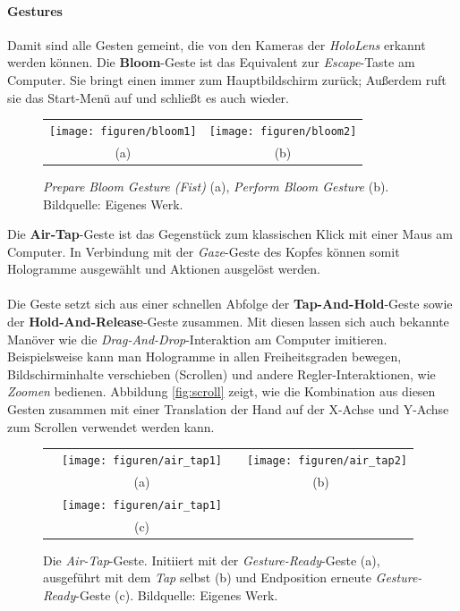 \paragraph*{Gestures} Damit sind alle Gesten gemeint, die von den Kameras der \textit{HoloLens} erkannt werden können.
Die \textbf{Bloom}-Geste ist das Equivalent zur \textit{Escape}-Taste am Computer. Sie bringt einen immer zum Hauptbildschirm zurück; Außerdem ruft sie das Start-Menü auf und schließt es auch wieder.\\
\begin{figure}[ht]
	\centering\small
	\setlength{\tabcolsep}{0mm}%
	\begin{tabular}{c@{\hspace{1mm}}c} %
		\texttt{[image: figuren/bloom1]} &
		\texttt{[image: figuren/bloom2]} \\
		(a) & (b)
	\end{tabular}
	\caption{
		\textit{Prepare Bloom Gesture (Fist)} (a), \textit{Perform Bloom Gesture} (b). Bildquelle: Eigenes Werk.
	}
	\label{fig:gesture_bloom}
\end{figure}
Die \textbf{Air-Tap}-Geste ist das Gegenstück zum klassischen Klick mit einer Maus am Computer. In Verbindung mit der \textit{Gaze}-Geste des Kopfes können somit Hologramme ausgewählt und Aktionen ausgelöst werden.\\\\Die Geste setzt sich aus einer schnellen Abfolge der \textbf{Tap-And-Hold}-Geste sowie der \textbf{Hold-And-Release}-Geste zusammen. Mit diesen lassen sich auch bekannte Manöver wie die \textit{Drag-And-Drop}-Interaktion am Computer imitieren. Beispielsweise kann man Hologramme in allen Freiheitsgraden bewegen, Bildschirminhalte verschieben (Scrollen) und andere Regler-Interaktionen, wie \textit{Zoomen} bedienen. Abbildung \ref{fig:scroll} zeigt, wie die Kombination aus diesen Gesten zusammen mit einer Translation der Hand auf der X-Achse und Y-Achse zum Scrollen verwendet werden kann.
\begin{figure}[H]
	\centering\small
	\setlength{\tabcolsep}{0mm}%
	\begin{tabular}{c c} %
	  \texttt{[image: figuren/air\_tap1]} &
	  \texttt{[image: figuren/air\_tap2]} \\
	  (a) & (b) \\
	  \texttt{[image: figuren/air\_tap1]} \\
	  (c)
	\end{tabular}
	\caption{Die \textit{Air-Tap}-Geste. Initiiert mit der \textit{Gesture-Ready}-Geste (a), ausgeführt mit dem \textit{Tap} selbst (b) und Endposition erneute \textit{Gesture-Ready}-Geste (c). Bildquelle: Eigenes Werk.
	}
	\label{fig:gesture_air_tap}
\end{figure}
